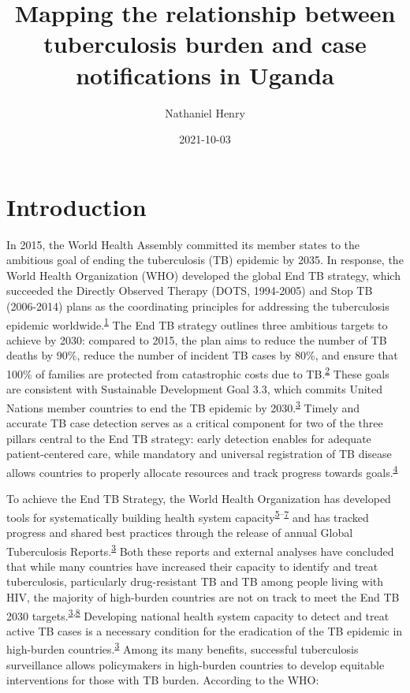 \documentclass[
]{article}
\title{Mapping the relationship between tuberculosis burden and case notifications in Uganda}
\author{Nathaniel Henry\textsuperscript{}}
\date{2021-10-03}
\begin{document}
\maketitle

\hypertarget{introduction}{%
\section{Introduction}\label{introduction}}

In 2015, the World Health Assembly committed its member states to the ambitious goal of ending the tuberculosis (TB) epidemic by 2035. In response, the World Health Organization (WHO) developed the global End TB strategy, which succeeded the Directly Observed Therapy (DOTS, 1994-2005) and Stop TB (2006-2014) plans as the coordinating principles for addressing the tuberculosis epidemic worldwide.\textsuperscript{\protect\hyperlink{ref-Onozaki2010}{1}} The End TB strategy outlines three ambitious targets to achieve by 2030: compared to 2015, the plan aims to reduce the number of TB deaths by 90\%, reduce the number of incident TB cases by 80\%, and ensure that 100\% of families are protected from catastrophic costs due to TB.\textsuperscript{\protect\hyperlink{ref-WorldHealthOrganization2015a}{2}} These goals are consistent with Sustainable Development Goal 3.3, which commits United Nations member countries to end the TB epidemic by 2030.\textsuperscript{\protect\hyperlink{ref-WorldHealthOrganization2020a}{3}} Timely and accurate TB case detection serves as a critical component for two of the three pillars central to the End TB strategy: early detection enables for adequate patient-centered care, while mandatory and universal registration of TB disease allows countries to properly allocate resources and track progress towards goals.\textsuperscript{\protect\hyperlink{ref-WorldHealthOrganization2015}{4}}

To achieve the End TB Strategy, the World Health Organization has developed tools for systematically building health system capacity\textsuperscript{\protect\hyperlink{ref-WHOWorldHealthOrganization2008}{5}--\protect\hyperlink{ref-WorldHealthOrganization2010}{7}} and has tracked progress and shared best practices through the release of annual Global Tuberculosis Reports.\textsuperscript{\protect\hyperlink{ref-WorldHealthOrganization2020a}{3}} Both these reports and external analyses have concluded that while many countries have increased their capacity to identify and treat tuberculosis, particularly drug-resistant TB and TB among people living with HIV, the majority of high-burden countries are not on track to meet the End TB 2030 targets.\textsuperscript{\protect\hyperlink{ref-WorldHealthOrganization2020a}{3},\protect\hyperlink{ref-Kyu2018}{8}} Developing national health system capacity to detect and treat active TB cases is a necessary condition for the eradication of the TB epidemic in high-burden countries.\textsuperscript{\protect\hyperlink{ref-WorldHealthOrganization2020a}{3}} Among its many benefits, successful tuberculosis surveillance allows policymakers in high-burden countries to develop equitable interventions for those with TB burden. According to the WHO:
\end{document}
